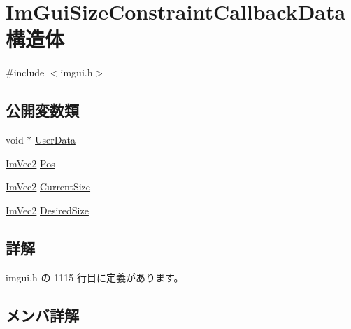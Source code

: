 \hypertarget{struct_im_gui_size_constraint_callback_data}{}\section{Im\+Gui\+Size\+Constraint\+Callback\+Data 構造体}
\label{struct_im_gui_size_constraint_callback_data}


{\ttfamily \#include $<$imgui.\+h$>$}

\subsection*{公開変数類}
\begin{DoxyCompactItemize}
\item 
void $\ast$ \mbox{\hyperlink{struct_im_gui_size_constraint_callback_data_a3b2fb1bd849f82edc78377f361433eac}{User\+Data}}
\item 
\mbox{\hyperlink{struct_im_vec2}{Im\+Vec2}} \mbox{\hyperlink{struct_im_gui_size_constraint_callback_data_ad3d81153905b00e6d513af4478d82cfd}{Pos}}
\item 
\mbox{\hyperlink{struct_im_vec2}{Im\+Vec2}} \mbox{\hyperlink{struct_im_gui_size_constraint_callback_data_ac7d5013d841044f410cba69344bdb4a1}{Current\+Size}}
\item 
\mbox{\hyperlink{struct_im_vec2}{Im\+Vec2}} \mbox{\hyperlink{struct_im_gui_size_constraint_callback_data_a1080a748a1769de07c5ae1e98de99ea3}{Desired\+Size}}
\end{DoxyCompactItemize}


\subsection{詳解}


 imgui.\+h の 1115 行目に定義があります。



\subsection{メンバ詳解}
\mbox{\label{struct_im_gui_size_constraint_callback_data_ac7d5013d841044f410cba69344bdb4a1}} 

